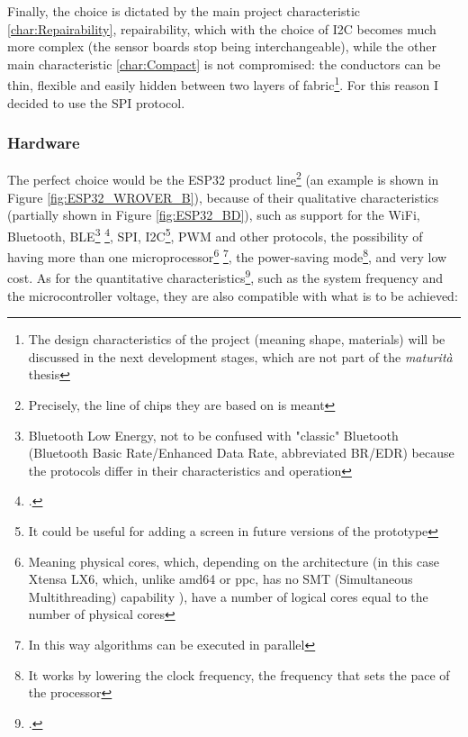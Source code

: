 \documentclass[a4paper, 10pt, final]{article} %
\newcommand{\parenciteit}[2]{\textit{\parencite[#1]{#2}}} %
\begin{document}
    \noindent Finally, the choice is dictated by the main project characteristic \ref{char:Repairability}, repairability, which with the choice of I2C becomes much more complex (the sensor boards stop being interchangeable), while the other main characteristic \ref{char:Compact} is not compromised: the conductors can be thin, flexible and easily hidden between two layers of fabric\footnote{The design characteristics of the project (meaning shape, materials) will be discussed in the next development stages, which are not part of the \emph{maturit\`{a}} thesis}. For this reason I decided to use the SPI protocol.

    \subsubsection{Hardware}\label{sec:MotherboardDesignHardware}
    The perfect choice would be the ESP32 product line\footnote{Precisely, the line of chips they are based on is meant} (an example is shown in Figure \ref{fig:ESP32_WROVER_B}), because of their qualitative characteristics (partially shown in Figure \ref{fig:ESP32_BD}), such as support for the WiFi, Bluetooth, BLE\footnote{Bluetooth Low Energy, not to be confused with "classic" Bluetooth (Bluetooth Basic Rate/Enhanced Data Rate, abbreviated BR/EDR) because the protocols differ in their characteristics and operation} \footcite[]{BLE:Wiki}, SPI, I2C\footnote{It could be useful for adding a screen in future versions of the prototype}, PWM and other protocols, the possibility of having more than one microprocessor\footnote{Meaning physical cores, which, depending on the architecture (in this case Xtensa LX6, which, unlike amd64 or ppc, has no SMT (Simultaneous Multithreading) capability \parenciteit{}{CPUSMT:Wiki}), have a number of logical cores equal to the number of physical cores} \footnote{In this way algorithms can be executed in parallel}, the power-saving mode\footnote{It works by lowering the clock frequency, the frequency that sets the pace of the processor}, and very low cost.
    As for the quantitative characteristics\footcite[]{ESP32:Datasheet}, such as the system frequency and the microcontroller voltage, they are also compatible with what is to be achieved:
\end{document}
